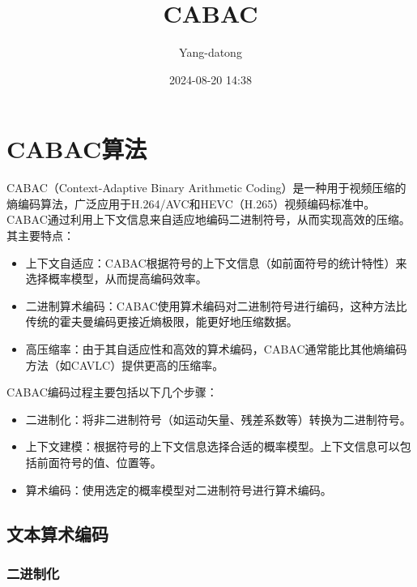 \documentclass{/home/hi/Study/template/code}
\title{CABAC}
\author{\textcopyright Yang-datong }
\date{2024-08-20 14:38}
\begin{document}
\makehead


\section{CABAC算法}
CABAC（Context-Adaptive Binary Arithmetic Coding）是一种用于视频压缩的熵编码算法，广泛应用于H.264/AVC和HEVC（H.265）视频编码标准中。CABAC通过利用上下文信息来自适应地编码二进制符号，从而实现高效的压缩。其主要特点：
\begin{itemize}
	\item 上下文自适应：CABAC根据符号的上下文信息（如前面符号的统计特性）来选择概率模型，从而提高编码效率。
	\item 二进制算术编码：CABAC使用算术编码对二进制符号进行编码，这种方法比传统的霍夫曼编码更接近熵极限，能更好地压缩数据。
	\item 高压缩率：由于其自适应性和高效的算术编码，CABAC通常能比其他熵编码方法（如CAVLC）提供更高的压缩率。
\end{itemize}

CABAC编码过程主要包括以下几个步骤：
\begin{itemize}
	\item 二进制化：将非二进制符号（如运动矢量、残差系数等）转换为二进制符号。
	\item 上下文建模：根据符号的上下文信息选择合适的概率模型。上下文信息可以包括前面符号的值、位置等。
	\item 算术编码：使用选定的概率模型对二进制符号进行算术编码。
\end{itemize}

\subsection{文本算术编码}
\subsubsection{二进制化}
\end{document}
